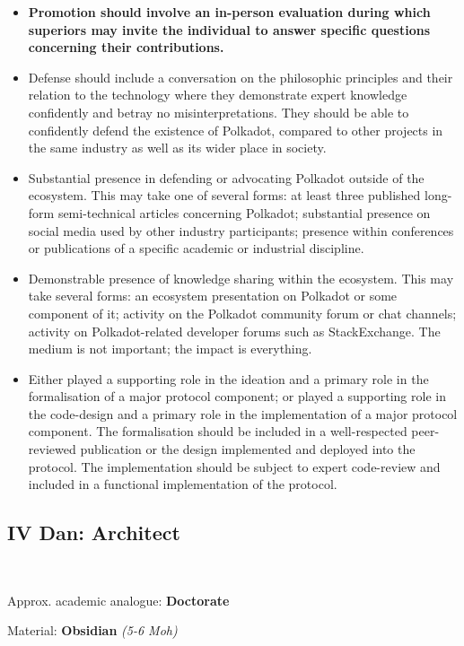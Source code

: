 \documentclass[9pt,oneside]{amsart}
\begin{document}
\begin{itemize}
\item \textbf{Promotion should involve an in-person evaluation during which superiors may invite the individual to answer specific questions concerning their contributions.}
\item Defense should include a conversation on the philosophic principles and their relation to the technology where they demonstrate expert knowledge confidently and betray no misinterpretations. They should be able to confidently defend the existence of Polkadot, compared to other projects in the same industry as well as its wider place in society.
\item Substantial presence in defending or advocating Polkadot outside of the ecosystem. This may take one of several forms: at least three published long-form semi-technical articles concerning Polkadot; substantial presence on social media used by other industry participants; presence within conferences or publications of a specific academic or industrial discipline.
\item Demonstrable presence of knowledge sharing within the ecosystem. This may take several forms: an ecosystem presentation on Polkadot or some component of it; activity on the Polkadot community forum or chat channels; activity on Polkadot-related developer forums such as StackExchange. The medium is not important; the impact is everything.
\item Either played a supporting role in the ideation and a primary role in the formalisation of a major protocol component; or played a supporting role in the code-design and a primary role in the implementation of a major protocol component. The formalisation should be included in a well-respected peer-reviewed publication or the design implemented and deployed into the protocol. The implementation should be subject to expert code-review and included in a functional implementation of the protocol.
\end{itemize}

\subsection{IV Dan: Architect}\label{iv-dan-architect}~\\


Approx. academic analogue: \textbf{Doctorate}

Material: \textbf{Obsidian} \emph{(5-6 Moh)}
\end{document}
